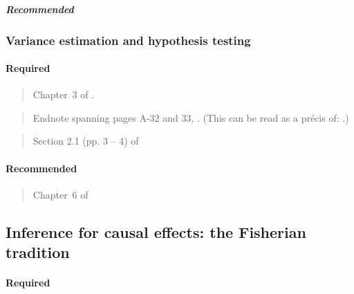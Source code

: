 \documentclass[12pt]{article}
\begin{document}
\subparagraph{Recommended}

\begin{verse}  \end{verse}
\begin{verse}  \end{verse}

\subsubsection{Variance estimation and hypothesis testing}

\paragraph*{Required}

\begin{verse}
  Chapter~3 of .
\end{verse}

\begin{verse} Endnote spanning pages A-32 and 33,
  .  (This can be read as a pr{\'e}cis
  of: .)
\end{verse}

\begin{verse} Section 2.1 (pp. 3 -- 4) of  \end{verse}

\paragraph*{Recommended}

\begin{verse} Chapter~6 of  \end{verse}

\begin{verse}  \end{verse}

\begin{verse}  \end{verse}

\subsection{Inference for causal effects: the Fisherian tradition}

\paragraph*{Required}
\end{document}
